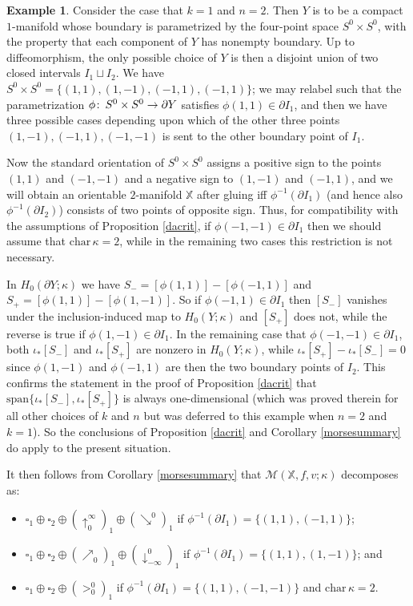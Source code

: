 \documentclass[11pt]{amsart}
\theoremstyle{definition}
\newtheorem{ex}[theorem]{Example}
\theoremstyle{remark}
\numberwithin{equation}{section}
\def\co{\colon\thinspace}
\begin{document}
\begin{ex}\label{k1n2}
Consider the case that $k=1$ and $n=2$.  Then $Y$ is to be a compact $1$-manifold whose boundary is parametrized by the four-point space $S^0\times S^0$, with the property that each component of $Y$ has nonempty boundary.  Up to diffeomorphism, the only possible choice of $Y$ is then a disjoint union of two closed intervals $I_1\sqcup I_2$.  We have $S^0\times S^0=\{(1,1),(1,-1),(-1,1),(-1,1)\}$; we may relabel such that the parametrization $\phi\co S^0\times S^0\to \partial Y$ satisfies $\phi(1,1)\in \partial I_1$, and then we have three possible cases depending upon which of the other three points $(1,-1),(-1,1),(-1,-1)$ is sent to the other boundary point of $I_1$.

Now the standard orientation of $S^0\times S^0$ assigns a positive sign to the points $(1,1)$ and $(-1,-1)$ and a negative sign to $(1,-1)$ and $(-1,1)$, and we will obtain an orientable $2$-manifold $\mathbb{X}$ after gluing iff $\phi^{-1}(\partial I_1)$ (and hence also $\phi^{-1}(\partial I_2)$) consists of two points of opposite sign.  Thus, for compatibility with the assumptions of Proposition \ref{dacrit}, if $\phi(-1,-1)\in\partial I_1$ then we should assume that $\mathrm{char}\,\kappa=2$, while in the remaining two cases  this restriction is not necessary.

In $H_0(\partial Y;\kappa)$ we have $S_-=[\phi(1,1)]-[\phi(-1,1)]$ and $S_+=[\phi(1,1)]-[\phi(1,-1)]$.  So if $\phi(-1,1)\in \partial I_1$ then $[S_-]$ vanishes under the inclusion-induced map to $H_0(Y;\kappa)$ and $[S_+]$ does not, while the reverse is true if $\phi(1,-1)\in \partial I_1$.  In the remaining case that $\phi(-1,-1)\in\partial I_1$, both $\iota_*[S_-]$ and $\iota_*[S_+]$ are nonzero in $H_0(Y;\kappa)$, while $\iota_*[S_+]-\iota_*[S_-]=0$ since $\phi(1,-1)$ and $\phi(-1,1)$ are then the two boundary points of $I_2$.  This confirms the statement in the proof of Proposition \ref{dacrit} that $\mathrm{span}\{\iota_*[S_-],\iota_*[S_+]\}$ is always one-dimensional (which was proved therein for all other choices of $k$ and $n$ but was deferred to this example when $n=2$ and $k=1$).  So the conclusions of Proposition \ref{dacrit} and Corollary \ref{morsesummary} do apply to the present situation.

It then follows from Corollary \ref{morsesummary} that  
$\mathcal{M}(\mathbb{X},f,v;\kappa)$ decomposes as:
\begin{itemize}\item[(i)] $\square_1\oplus \square_2\oplus (\uparrow_{0}^{\infty})_{1}\oplus (\searrow^0)_1$ if $\phi^{-1}(\partial I_1)=\{(1,1),(-1,1)\}$; \item[(ii)]  $\square_1\oplus \square_2\oplus (\nearrow_{0})_{1}\oplus (\downarrow^0_{-\infty})_1$ if $\phi^{-1}(\partial I_1)=\{(1,1),(1,-1)\}$; and \item[(iii)]  $\square_1\oplus \square_2\oplus (>_0^0)_1$ if $\phi^{-1}(\partial I_1)=\{(1,1),(-1,-1)\}$ and $\mathrm{char}\,\kappa=2$. \end{itemize}


\end{ex}
\end{document}
